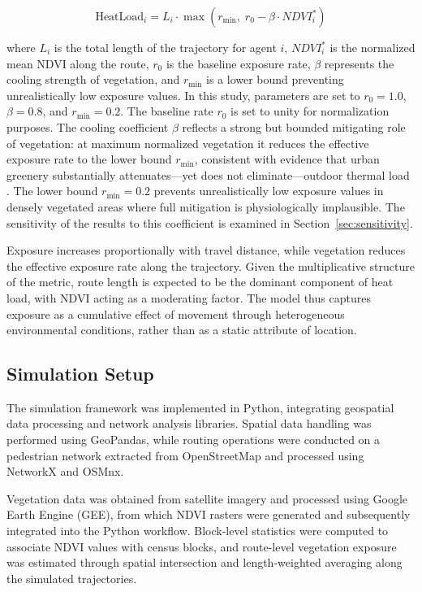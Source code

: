\documentclass{wscpaperproc}
\theoremstyle{wsc}
\begin{document}
\[
\text{HeatLoad}_i = L_i \cdot \max\left(r_{\min},\; r_0 - \beta \cdot NDVI_i^{*}\right)
\]

where \(L_i\) is the total length of the trajectory for agent \(i\), \(NDVI_i^{*}\) is the normalized mean NDVI along the route, \(r_0\) is the baseline exposure rate, \(\beta\) represents the cooling strength of vegetation, and \(r_{\min}\) is a lower bound preventing unrealistically low exposure values. 
In this study, parameters are set to \(r_0 = 1.0\), \(\beta = 0.8\), and \(r_{\min} = 0.2\). The baseline rate \(r_0 \) is set to unity for normalization purposes. The cooling coefficient \(\beta\) reflects a strong but bounded mitigating role of vegetation: at maximum normalized vegetation it reduces the effective exposure rate to the lower bound \(r_{\min}\), consistent with evidence that urban greenery substantially attenuates—yet does not eliminate—outdoor thermal load \cite{schwaab2021urban}. The lower bound \(r_{\min} = 0.2\) prevents unrealistically low exposure values in densely vegetated areas where full mitigation is physiologically implausible. The sensitivity of the results to this coefficient is examined in Section~\ref{sec:sensitivity}.


Exposure increases proportionally with travel distance, while vegetation reduces the effective exposure rate along the trajectory. Given the multiplicative structure of the metric, route length is expected to be the dominant component of heat load, with NDVI acting as a moderating factor. The model thus captures exposure as a cumulative effect of movement through heterogeneous environmental conditions, rather than as a static attribute of location.

\subsection{Simulation Setup}

The simulation framework was implemented in Python, integrating geospatial data processing and network analysis libraries. Spatial data handling was performed using GeoPandas, while routing operations were conducted on a pedestrian network extracted from OpenStreetMap and processed using NetworkX and OSMnx.

Vegetation data was obtained from satellite imagery and processed using Google Earth Engine (GEE), from which NDVI rasters were generated and subsequently integrated into the Python workflow. Block-level statistics were computed to associate NDVI values with census blocks, and route-level vegetation exposure was estimated through spatial intersection and length-weighted averaging along the simulated trajectories.
\end{document}
